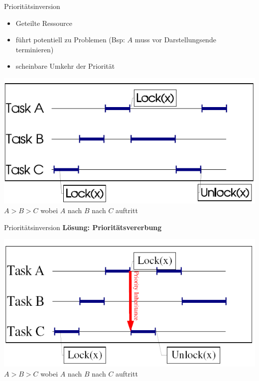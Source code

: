 

\begin{frame}{Prioritätsinversion}
	\begin{itemize}
		\item Geteilte Ressource
		\item führt potentiell zu Problemen (Bsp: \(A\) muss vor Darstellungsende terminieren)
		\item scheinbare Umkehr der Priorität
	\end{itemize}
	\begin{center}
		\includegraphics[scale=0.5]{images/prioInv} \cite{jamaicaPic} \\
		\(A > B > C\) wobei \(A\) nach \(B\) nach \(C\) auftritt
	\end{center}
\end{frame}

\begin{frame}{Prioritätsinversion}
	\textbf{Lösung: Prioritätsvererbung}
	\begin{center}
		\includegraphics[scale=0.5]{images/prioInh} \cite{jamaicaPic} \\
		\(A > B > C\) wobei \(A\) nach \(B\) nach \(C\) auftritt
	\end{center}
\end{frame}

